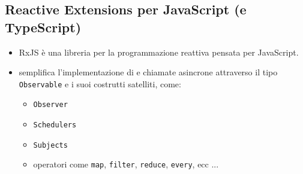        \subsection{Reactive Extensions per JavaScript (e TypeScript)}\label{subsec:rxjs}

        \begin{frame}[fragile]{\insertsectionhead}
            \begin{block}{\insertsubsectionhead\footnotemark}
                \begin{itemize}
                    \item
                        RxJS è una libreria per la programmazione reattiva pensata per JavaScript.
                    \item
                        semplifica l'implementazione di  e chiamate asincrone attraverso il tipo \texttt{Observable} e i suoi costrutti satelliti, come:
                        \begin{itemize}
                            \item \texttt{Observer}
                            \item \texttt{Schedulers}
                            \item \texttt{Subjects}
                            \item operatori come \texttt{map}, \texttt{filter}, \texttt{reduce}, \texttt{every}, ecc ...
                        \end{itemize}
                \end{itemize}
            \end{block}
        \end{frame}

